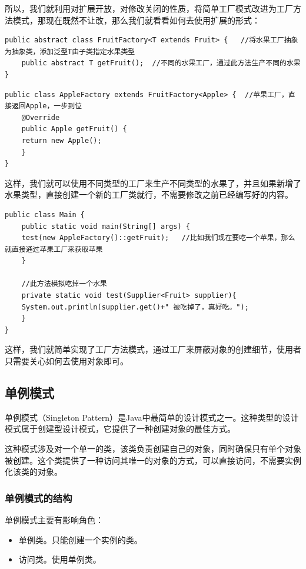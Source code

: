 \documentclass[11pt]{article}
\begin{document}
所以，我们就利用对扩展开放，对修改关闭的性质，将简单工厂模式改进为工厂方法模式，那现在既然不让改，那么我们就看看如何去使用扩展的形式：
\begin{verbatim}
public abstract class FruitFactory<T extends Fruit> {   //将水果工厂抽象为抽象类，添加泛型T由子类指定水果类型
    public abstract T getFruit();  //不同的水果工厂，通过此方法生产不同的水果
}
\end{verbatim}
\begin{verbatim}
public class AppleFactory extends FruitFactory<Apple> {  //苹果工厂，直接返回Apple，一步到位
    @Override
    public Apple getFruit() {
	return new Apple();
    }
}
\end{verbatim}
这样，我们就可以使用不同类型的工厂来生产不同类型的水果了，并且如果新增了水果类型，直接创建一个新的工厂类就行，不需要修改之前已经编写好的内容。
\begin{verbatim}
public class Main {
    public static void main(String[] args) {
	test(new AppleFactory()::getFruit);   //比如我们现在要吃一个苹果，那么就直接通过苹果工厂来获取苹果
    }

    //此方法模拟吃掉一个水果
    private static void test(Supplier<Fruit> supplier){
	System.out.println(supplier.get()+" 被吃掉了，真好吃。");
    }
}
\end{verbatim}

这样，我们就简单实现了工厂方法模式，通过工厂来屏蔽对象的创建细节，使用者只需要关心如何去使用对象即可。



\subsection{单例模式}
\label{sec:org238c7b6}
单例模式（Singleton Pattern）是Java中最简单的设计模式之一。这种类型的设计模式属于创建型设计模式，它提供了一种创建对象的最佳方式。

这种模式涉及对一个单一的类，该类负责创建自己的对象，同时确保只有单个对象被创建。这个类提供了一种访问其唯一的对象的方式，可以直接访问，不需要实例化该类的对象。

\subsubsection{单例模式的结构}
\label{sec:org10433dc}
单例模式主要有影响角色：
\begin{itemize}
\item 单例类。只能创建一个实例的类。
\item 访问类。使用单例类。
\end{itemize}
\end{document}
